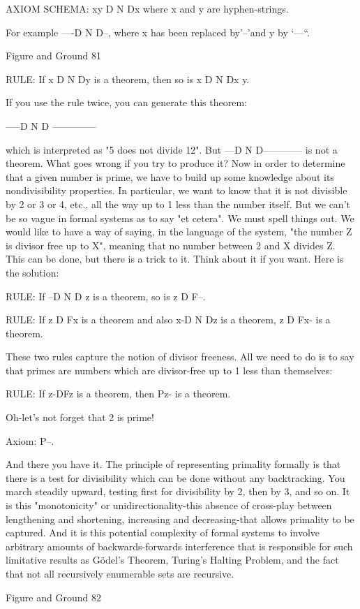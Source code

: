        AXIOM SCHEMA: xy D N Dx where x and y are hyphen-strings.

       For example ----D N D--, where x has been replaced by'--'and y by ‘---“.




Figure and Ground                                                                         81

RULE: If x D N Dy is a theorem, then so is x D N Dx y.

If you use the rule twice, you can generate this theorem:

               -----D N D --------------

which is interpreted as "5 does not divide 12". But ---D N D------------ is not a theorem.
What goes wrong if you try to produce it?
         Now in order to determine that a given number is prime, we have to build up
some knowledge about its nondivisibility properties. In particular, we want to know that
it is not divisible by 2 or 3 or 4, etc., all the way up to 1 less than the number itself. But
we can't be so vague in formal systems as to say "et cetera". We must spell things out.
We would like to have a way of saying, in the language of the system, "the number Z is
divisor free up to X", meaning that no number between 2 and X divides Z. This can be
done, but there is a trick to it. Think about it if you want.
         Here is the solution:

RULE: If --D N D z is a theorem, so is z D F--.

RULE: If z D Fx is a theorem and also x-D N Dz is a theorem, z D Fx- is a theorem.

These two rules capture the notion of divisor freeness. All we need to do is to say that
primes are numbers which are divisor-free up to 1 less than themselves:

RULE: If z-DFz is a theorem, then Pz- is a theorem.

Oh-let's not forget that 2 is prime!

Axiom: P--.

And there you have it. The principle of representing primality formally is that there is a
test for divisibility which can be done without any backtracking. You march steadily
upward, testing first for divisibility by 2, then by 3, and so on. It is this "monotonicity" or
unidirectionality-this absence of cross-play between lengthening and shortening,
increasing and decreasing-that allows primality to be captured. And it is this potential
complexity of formal systems to involve arbitrary amounts of backwards-forwards
interference that is responsible for such limitative results as Gödel’s Theorem, Turing's
Halting Problem, and the fact that not all recursively enumerable sets are recursive.




Figure and Ground                                                                           82

